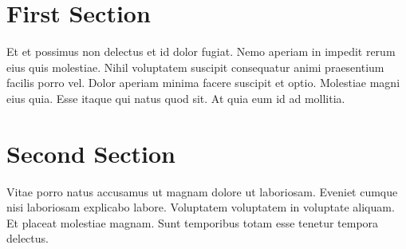 \documentclass{scrbook}
\begin{document}
    \section{First Section}
        Et et possimus non delectus et id dolor fugiat. Nemo aperiam in
         impedit rerum eius quis molestiae.
        \footnotesize
        Nihil voluptatem suscipit consequatur animi praesentium facilis
        porro vel.
        \pstart
        Dolor aperiam minima facere suscipit et optio.
        \pend
        Molestiae magni eius quia. Esse itaque qui natus quod sit. At
        quia eum id ad mollitia.
    \section{Second Section}
        Vitae porro natus accusamus ut magnam dolore ut laboriosam. Eveniet cumque nisi laboriosam explicabo labore. Voluptatem voluptatem in voluptate aliquam. Et placeat molestiae magnam. Sunt temporibus totam esse tenetur tempora delectus.
\end{document}
